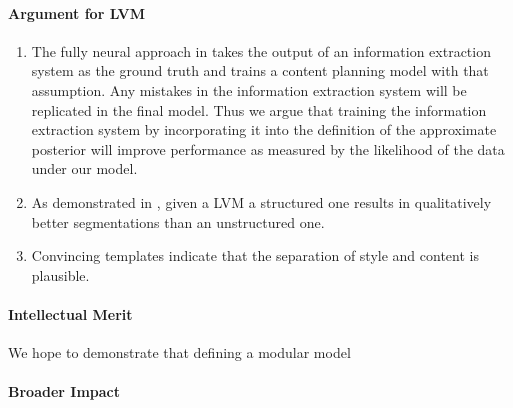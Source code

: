 \documentclass[11pt]{article}
\begin{document}
\paragraph{Argument for LVM}
\begin{enumerate}
\item The fully neural approach in \citep{puduppully2018contentselection} takes the output of
an information extraction system as the ground truth and trains a content planning model with
that assumption.
Any mistakes in the information extraction system will be replicated in the final model.
Thus we argue that training the information extraction system by incorporating it
into the definition of the approximate posterior will improve performance as measured by
the likelihood of the data under our model.
\item As demonstrated in \citep{liang2009semalign},
given a LVM a structured one results in qualitatively better segmentations than an unstructured one.
\item Convincing templates \citep{wiseman2018template} indicate that the separation of
style and content is plausible.
\end{enumerate}

% 
\paragraph{Intellectual Merit}
We hope to demonstrate that defining a modular model 
\paragraph{Broader Impact}



\end{document}
